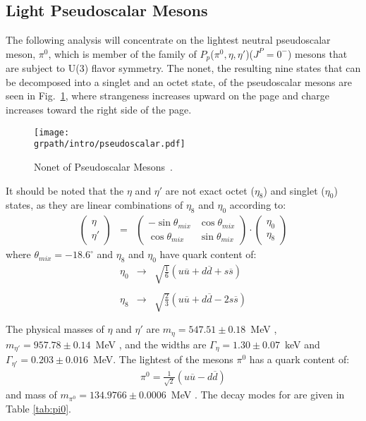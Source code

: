 \subsection{Light Pseudoscalar Mesons} 
The following analysis will concentrate on the lightest neutral pseudoscalar meson, $\pi^0$, which is member of the family of $P_p$($\pi^{0}, \eta, \eta'$)($J^{P}=0^{-}$) mesons that are subject to U(3) flavor symmetry. The nonet, the resulting nine states that can be decomposed into a singlet and an octet state, of the pseudoscalar mesons are seen in Fig.~\ref{fig:nonet.pseud}, where strangeness increases upward on the page and charge increases toward the right side of the page.
\begin{figure}[h!]\begin{center}
\texttt{[image: \\grpath/intro/pseudoscalar.pdf]}
\caption[Nonet of Pseudoscalar Mesons]{\label{fig:nonet.pseud}Nonet of Pseudoscalar Mesons~\cite{wiki1}.}
\end{center}\end{figure}
It should be noted that the $\eta$ and $\eta'$ are not exact octet ($\eta_{8}$) and singlet ($\eta_{0}$) states, as they are linear combinations of $\eta_{8}$ and $\eta_{0}$ according to:
\begin{eqnarray}
\left(
\begin{array}{cc}
\eta \\
\eta ' 
\end{array}
\right)
& = &
\left(
\begin{array}{cc}
-\sin\theta_{mix} & \cos\theta_{mix} \\
\cos\theta_{mix} & \sin\theta_{mix}
\end{array}
\right)
\cdot
\left(
\begin{array}{cc}
\eta_{0} \\
\eta_{8}
\end{array}
\right)
\end{eqnarray}
where $\theta_{mix} = -18.6^{\circ}$\cite{Goity} and $\eta_{8}$ and $\eta_{0}$  have quark content of:
\begin{eqnarray}
\eta_{0} &\rightarrow & \sqrt{\frac{1}{6}}(u\overline{u} + d\overline{d} +  s\overline{s})\nonumber\\
\nonumber \\
\eta_{8} &\rightarrow & \sqrt{\frac{2}{3}}(u\overline{u} + d\overline{d} - 2s\overline{s})\nonumber \\
\nonumber \\
\nonumber 
\end{eqnarray}
The physical masses of $\eta$ and $\eta'$ are $m_{\eta} = 547.51\pm 0.18$~MeV \cite{pdg2014}, $m_{\eta'} =957.78 \pm 0.14$~MeV \cite{pdg2014}, and the widths are $\Gamma_{\eta} =1.30\pm0.07$~keV and $\Gamma_{\eta'} = 0.203\pm0.016$~MeV.
The lightest of the mesons $\pi^{0}$ has a quark content of:
\begin{eqnarray}
\pi^{0} = \frac{1}{\sqrt{2}}(u\overline{u} - d\overline{d})\nonumber
\end{eqnarray}
and mass of $m_{\pi^{0}} = 134.9766 \pm 0.0006$~MeV \cite{pdg2014}. The decay modes for \piz are given in Table \ref{tab:pi0}.


